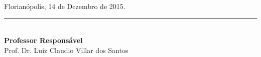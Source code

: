 \documentclass{ufsc-thesis} %
\begin{document}
\begin{anexosenv}
{\begin{tabular}{|l|X p{8cm}|}
        \end{tabular}
    }

    \vspace{40pt}

    \begin{flushright}

        Florianópolis, 14 de Dezembro de 2015.

    \end{flushright}

    \vspace{20pt}


    \begin{center}
        \parbox{7cm}{%
            \centering
        \rule{6cm}{1pt}\\
        \small \textbf{Professor Responsável}\\
        Prof. Dr. Luiz Claudio Villar dos Santos
        }
        \hfill
    \end{center}

\end{anexosenv}
\end{document}
